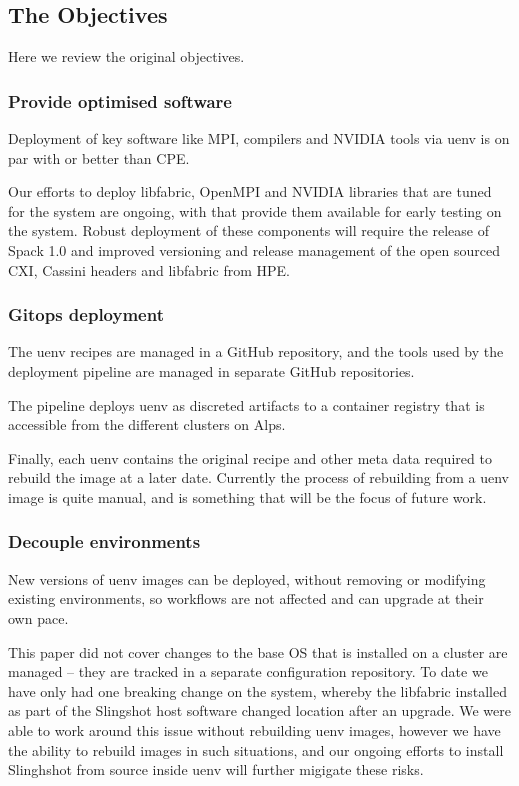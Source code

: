 \subsection{The Objectives}
Here we review the original objectives.

\subsubsection{Provide optimised software}

Deployment of key software like MPI, compilers and NVIDIA tools via uenv is on par with or better than CPE.

Our efforts to deploy libfabric, OpenMPI and NVIDIA libraries that are tuned for the system are ongoing, with that provide them available for early testing on the system.
Robust deployment of these components will require the release of Spack 1.0 and improved versioning and release management of the open sourced CXI, Cassini headers and libfabric from HPE.

\subsubsection{Gitops deployment}

The uenv recipes are managed in a GitHub repository, and the tools used by the deployment pipeline are managed in separate GitHub repositories.

The pipeline deploys uenv as discreted artifacts to a container registry that is accessible from the different clusters on Alps.

Finally, each uenv contains the original recipe and other meta data required to rebuild the image at a later date.
Currently the process of rebuilding from a uenv image is quite manual, and is something that will be the focus of future work.

\subsubsection{Decouple environments}

New versions of uenv images can be deployed, without removing or modifying existing environments, so workflows are not affected and can upgrade at their own pace.

This paper did not cover changes to the base OS that is installed on a cluster are managed -- they are tracked in a separate configuration repository.
To date we have only had one breaking change on the system, whereby the libfabric installed as part of the Slingshot host software changed location after an upgrade.
We were able to work around this issue without rebuilding uenv images, however we have the ability to rebuild images in such situations, and our ongoing efforts to install Slinghshot from source inside uenv will further migigate these risks.


